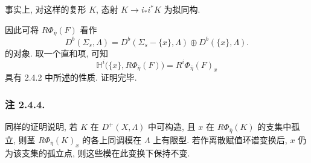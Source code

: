事实上, 对这样的复形 $K$, 态射 $K\longrightarrow i_*i^*K$ 为拟同构.

因此可将 $R\Phi_{\bar\eta}(F)$ 看作
\[
D^b(\Sigma_s,\Lambda)
=D^b(\Sigma_s-\{x\},\Lambda)\oplus D^b(\{x\},\Lambda).
\]
的对象. 取一个直和项, 可知
\[
\mathbb H^i\bigl(\{x\},R\Phi_{\bar\eta}(F)\bigr)
=R^i\Phi_{\bar\eta}(F)_x
\]
具有 2.4.2 中所述的性质. 证明完毕.

\subsubsection*{注 2.4.4.}
同样的证明说明, 若 $K$ 在 $D^+(X,\Lambda)$ 中可构造, 且 $x$ 在 $R\Phi_{\bar\eta}(K)$ 的支集中孤立, 则茎 $R\Phi_{\bar\eta}(K)_x$ 的各上同调模在 $\Lambda$ 上有限型. 若作离散赋值环谱变换后, $x$ 仍为该支集的孤立点, 则这些模在此变换下保持不变.
